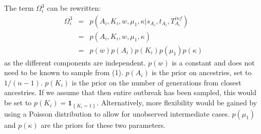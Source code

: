 \documentclass[10pt]{article}
\begin{document}
The term $\Omega_i^3$ can be rewritten:
\begin{eqnarray}
\Omega_i^3 &=&  p(A_i, K_i, w, \mu_1, \kappa | s_{A_i}, t_{A_i}, T_{A_i}^{inf})\\
&=&  p(A_i, K_i, w, \mu_1, \kappa)\\
      & = &   p(w) p(A_i) p(K_i)  p(\mu_1) p(\kappa)
\end{eqnarray}
as the different components are independent.
$p(w)$ is a constant and does not need to be known to sample from (1).
$p(A_i)$ is the prior on ancestries, set to $1/(n-1)$.
$p(K_i)$ is the prior on the number of generations from closest ancestries. 
If we assume that then entire outbreak has been sampled, this would be set to $p(K_i) = \mathbf{1}_{\left\lbrace K_i=1\right\rbrace}$.
Alternatively, more flexibility would be gained by using a Poisson distribution to allow for unobserved intermediate cases.
$ p(\mu_1)$ and $p(\kappa)$ are the priors for these two parameters.
~\\
\end{document}
